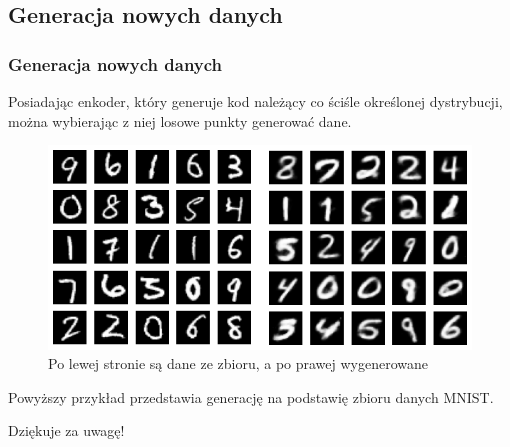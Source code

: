 \documentclass{beamer}
\begin{document}
	\begin{frame}
		\subsection{Generacja nowych danych}
		\frametitle{Generacja nowych danych}
		Posiadając enkoder, który generuje kod należący co ściśle określonej dystrybucji, można wybierając z niej losowe punkty generować dane. 
		
		\begin{figure}
			\centering\includegraphics{vaegeneracja.png} 
			\caption{Po lewej stronie są dane ze zbioru, a po prawej wygenerowane}
		\end{figure}
	
	Powyższy przykład przedstawia generację na podstawię zbioru danych MNIST.
		
	\end{frame}

	\begin{frame}
		\begin{center}
			\huge Dziękuje za uwagę!
		\end{center}
	\end{frame}
\end{document}

